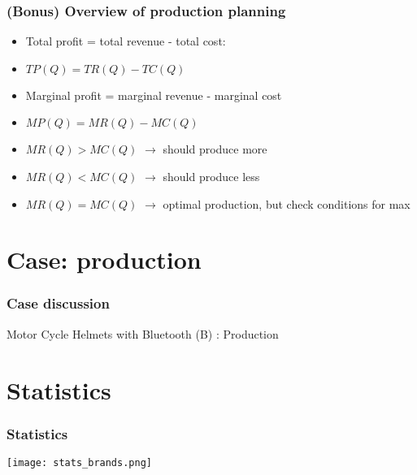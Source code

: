 \documentclass[xcolor=dvipsnames]{beamer} %
\begin{document}
\begin{frame}
\frametitle{(Bonus) Overview of production planning}
\begin{itemize}
    \itemsep\setlength{1em}
\item Total profit = total revenue - total cost:
\item[] $TP(Q) = TR(Q) - TC(Q)$
\item Marginal profit = marginal revenue - marginal cost 
\item[] $MP(Q) = MR(Q) - MC(Q)$
\item $MR(Q) > MC(Q)$ $\rightarrow$ should produce more 
\item $MR(Q) < MC(Q)$ $\rightarrow$ should produce less
\item $MR(Q) = MC(Q)$ $\rightarrow$ optimal production, but check conditions for max
\end{itemize}
\end{frame}

\section{Case: production}

\begin{frame}
\frametitle{Case discussion}
Motor Cycle Helmets with Bluetooth (B) : Production
\end{frame}

\section{Statistics}

\begin{frame}
\frametitle{Statistics}
\begin{center}
\hspace*{-0.5cm} \texttt{[image: stats\_brands.png]}
\end{center}
\end{frame}
\end{document}
